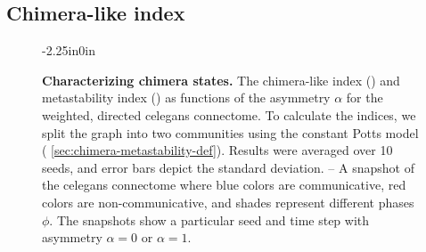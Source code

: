 \documentclass[10pt,letterpaper]{article}
\begin{document}
\subsection{Chimera-like index}
\label{sec:chimera_index}
\begin{figure}
\begin{adjustwidth}{-2.25in}{0in}
  \centering
  \begin{subcaptiongroup}
      {\label{fig:graph_celegans_asymmetry1}\captiontext*{}}{%
      {\label{fig:graph_celegans_asymmetry0}\captiontext*{}}{%
      {\label{fig:metastability_index}\captiontext*{}}{%
      {\label{fig:chimera_index}\captiontext*{}}{%
    {}%
  }}}}
  \end{subcaptiongroup}
  \caption{
    \textbf{
      Characterizing chimera states.
    }
    The chimera-like index ()
    and
    metastability index ()
    as functions of the asymmetry $\alpha$
    for the
    weighted, directed \gls{celegans} connectome.
    To calculate the indices,
    we split the graph into two communities using the constant Potts
    model (\cf{} \cref{sec:chimera-metastability-def}).
		Results were averaged over 10 seeds,
		and error bars depict the standard deviation.
    --
    A snapshot of the \gls{celegans} connectome where
    blue colors are communicative,
    red colors are non-communicative,
    and shades represent different phases $\phi$.
		The snapshots show a particular seed
		and time step with
    asymmetry
    $\alpha = 0$
    or
    $\alpha = 1$.
  }\label{fig:chimera-index}
\end{adjustwidth}
\end{figure}
\end{document}
